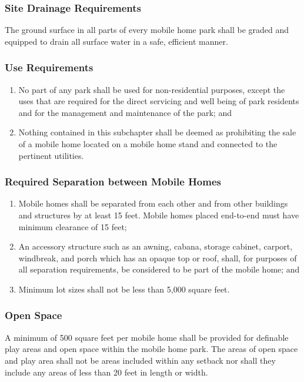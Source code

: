 \subsubsection{Site Drainage Requirements}
The ground surface in all parts of every mobile home park shall be graded and equipped to drain all surface water in a safe, efficient manner.
\subsubsection{Use Requirements}
\begin{enumerate}[{\indent}a)]
    \item No part of any park shall be used for non-residential purposes, except the uses that are required for the direct servicing and well being of park residents and for the management and maintenance of the park; and 
    \item Nothing contained in this subchapter shall be deemed as prohibiting the sale of a mobile home located on a mobile home stand and connected to the pertinent utilities.
\end{enumerate}
\subsubsection{Required Separation between Mobile Homes}
\begin{enumerate}[{\indent}a)]
    \item Mobile homes shall be separated from each other and from other buildings and structures by at least 15 feet. Mobile homes placed end-to-end must have minimum clearance of 15 feet; 
    \item An accessory structure such as an awning, cabana, storage cabinet, carport, windbreak, and porch which has an opaque top or roof, shall, for purposes of all separation requirements, be considered to be part of the mobile home; and 
    \item Minimum lot sizes shall not be less than 5,000 square feet.
\end{enumerate}
\subsubsection{Open Space}
A minimum of 500 square feet per mobile home shall be provided for definable play areas and open space within the mobile home park. The areas of open space and play area shall not be areas included within any setback nor shall they include any areas of less than 20 feet in length or width.
